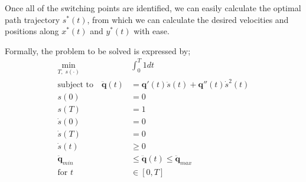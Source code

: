Once all of the switching points are identified, we can easily calculate the optimal path trajectory $s^*(t)$, from which we can calculate the desired velocities and positions along $x^*(t)$ and $y^	*(t)$ with ease.

Formally, the problem to be solved is expressed by;
\begin{align*}
\min_{T, \; s(\cdot)} \;& \int_0^T1dt\\
\text{subject to} \quad \ddot{\textbf{q}}(t) &= \textbf{q}'(t)\ddot{s}(t) + \textbf{q}''(t)\dot{s}^2(t)\\
s(0) &= 0\\
s(T) &= 1\\
\dot{s}(0) &= 0\\
\dot{s}(T) &= 0\\
\dot{s}(t) &\geq 0\\
\ddot{\textbf{q}}_{min} &\leq \ddot{\textbf{q}}(t) \leq \ddot{\textbf{q}}_{max}\\
\text{for } t &\in [0,T]\\
\end{align*}